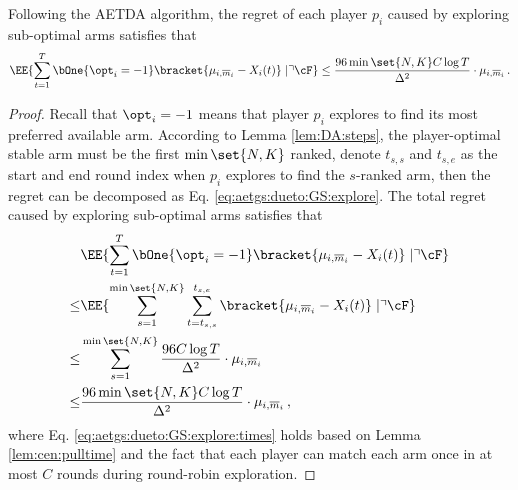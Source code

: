 \begin{lemma}\label{lem:aetda:sub-optimal}
    Following the AETDA algorithm, the regret of each player $p_i$ caused by exploring sub-optimal arms satisfies that 
    \begin{align*}
        \EE{\sum_{t=1}^T \bOne{\opt_i = -1}\bracket{\mu_{i,\overline{m}_i} - X_{i}(t)} \mid 
    \urcorner \cF } \le \frac{96\min\set{N,K} C\log T}{\Delta^2}\cdot  \mu_{i,\overline{m}_i} \,.\\
    \end{align*}
\end{lemma}

\begin{proof}
Recall that $\opt_i=-1$ means that player $p_i$ explores to find its most preferred available arm. 
According to Lemma \ref{lem:DA:steps}, the player-optimal stable arm must be the first $\min\set{N,K}$ ranked, denote $t_{s,s}$ and $t_{s,e}$ as the start and end round index when $p_i$ explores to find the $s$-ranked arm, then the regret can be decomposed as Eq. \eqref{eq:aetgs:dueto:GS:explore}. The total regret caused by exploring sub-optimal arms satisfies that
    \begin{align}
        &\EE{\sum_{t=1}^T \bOne{\opt_i = -1}\bracket{\mu_{i,\overline{m}_i} - X_{i}(t)} \mid 
    \urcorner \cF } \notag \\
        \le &  \EE{ \sum_{s=1}^{\min\set{N,K}} \sum_{t=t_{s,s}}^{t_{s,e}}  \bracket{\mu_{i,\overline{m}_i} - X_{i}(t)} \mid \urcorner \cF } \label{eq:aetgs:dueto:GS:explore} \\
        \le& \sum_{s=1}^{\min\set{N,K}} \frac{96C\log T}{\Delta^2} \cdot \mu_{i,\overline{m}_i} \label{eq:aetgs:dueto:GS:explore:times} \\
        \le& \frac{96\min\set{N,K} C\log T}{\Delta^2}\cdot  \mu_{i,\overline{m}_i} \notag \,,
    \end{align}
    where Eq. \eqref{eq:aetgs:dueto:GS:explore:times} holds based on Lemma \ref{lem:cen:pulltime} and the fact that each player can match each arm once in at most $C$ rounds during round-robin exploration.
\end{proof}






